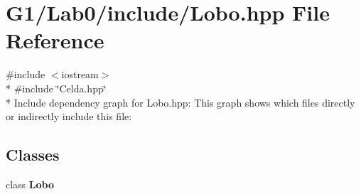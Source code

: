 \section{G1/\+Lab0/include/\+Lobo.hpp File Reference}
\label{_lobo_8hpp}
{\ttfamily \#include $<$iostream$>$}\\*
{\ttfamily \#include \char`\"{}Celda.\+hpp\char`\"{}}\\*
Include dependency graph for Lobo.\+hpp\+:
This graph shows which files directly or indirectly include this file\+:
\subsection*{Classes}
\begin{DoxyCompactItemize}
\item 
class {\bf Lobo}
\end{DoxyCompactItemize}
